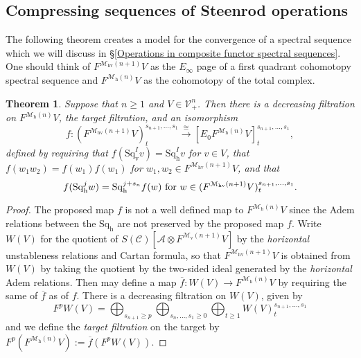 \documentclass[11pt]{amsart} \renewcommand{\baselinestretch}{1.2}
\theoremstyle{plain}
\newtheorem{thm}{Theorem}[section]
\theoremstyle{definition}
\renewcommand{\to}{\longrightarrow}
\newcommand{\scrC}{\mathscr{C}}
\newcommand{\calA}{\mathcal{A}}
\newcommand{\calV}{\mathcal{V}}
\newcommand{\calMv}{\mathcal{M}\dver}
\newcommand{\calMh}{\mathcal{M}\dhor}
\newcommand{\calMhv}{\mathcal{M}_\mathrm{hv}}
\newcommand{\CommOperad}{{\scrC}}
\newcommand{\vect}[2]{\calV^{#1}_{#2}}
\newcommand{\LieSteen}{\calA}
\newcommand{\Edown}[4]{[E_{#1}#2]^{#3}_{#4}}
\newcommand{\dver}{_\mathrm{v}}
\newcommand{\dhor}{_\mathrm{h}}
\newcommand{\Sqh}{\mathrm{Sq}\dhor}
\newcommand{\Sqv}{\mathrm{Sq}\dver}
\begin{document}
\begin{Cohomology Operations for W and U}
\subsection{Compressing sequences of Steenrod operations}
The following theorem creates a model for the convergence of a spectral sequence which we will discuss in \S\ref{Operations in composite functor spectral sequences}. One should think of $F^{\calMhv(n+1)}V$ as the $E_\infty$ page of  a first quadrant cohomotopy spectral sequence and $F^{\calMh(n)}V$ as the cohomotopy of the total complex.
\begin{thm}
\label{thm on compressing seqs of steenrod ops}
Suppose that $n\geq1$ and $V\in \vect{n}{+}$. Then there is a decreasing filtration on $F^{\calMh(n)}V$, the \emph{target filtration}, and an isomorphism
\[ f:(F^{\calMhv(n+1)}V)^{s_{n+1},\ldots,s_1}_t\overset{\cong}{\to} \Edown{0}{F^{\calMh(n)}V}{s_{n+1},\ldots,s_1}{t},\]
defined by requiring that
$f(\Sqv^Iv)=\Sqh^Iv$ for $v\in V$, that $f(w_1w_2)=f(w_1)f(w_1)$ for $w_1,w_2\in F^{\calMhv(n+1)}V$,
and that
\[f(\Sqh^jw)=\Sqh^{j+s_n}f(w)\textup{ for }w\in (F^{\calMhv(n+1)}V)^{s_{n+1},\ldots,s_1}_t.\]
\end{thm}
\begin{proof}
The proposed map $f$ is not a well defined map to $F^{\calMh(n)}V$ since the Adem relations between the $\Sqh$ are not preserved by the proposed map $f$. Write $W(V)$ for the quotient of $S(\CommOperad)[\LieSteen\otimes F^{\calMv(n+1)}V]$ by the \emph{horizontal} unstableness relations and Cartan formula, so that $F^{\calMhv(n+1)}V$ is obtained from $W(V)$ by taking the quotient by the two-sided ideal generated by the \emph{horizontal} Adem relations. Then may define a map $\overline{f}:W(V)\to F^{\calMh(n)}V$ by requiring the same of $\overline{f}$ as of $f$. There is a decreasing filtration on $W(V)$, given by 
\[F^pW(V)=\bigoplus_{s_{n+1}\geq p}\bigoplus_{s_n,\ldots,s_1\geq0}\bigoplus_{t\geq1}W(V)^{s_{n+1},\ldots,s_1}_t\]
 and we define the \emph{target filtration} on the target by $F^p(F^{\calMh(n)}V):=\overline{f}(F^pW(V))$.


\end{proof}
\end{Cohomology Operations for W and U}
\end{document}
